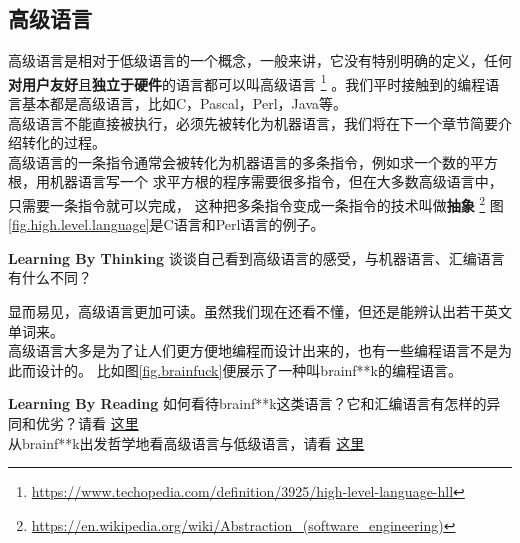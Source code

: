 \subsection{高级语言}
高级语言是相对于低级语言的一个概念，一般来讲，它没有特别明确的定义，任何\textbf{对用户友好}且\textbf{独立于硬件}的语言都可以叫高级语言
\footnote{\url{https://www.techopedia.com/definition/3925/high-level-language-hll}}
。我们平时接触到的编程语言基本都是高级语言，比如C，Pascal，Perl，Java等。\\
高级语言不能直接被执行，必须先被转化为机器语言，我们将在下一个章节简要介绍转化的过程。\\
高级语言的一条指令通常会被转化为机器语言的多条指令，例如求一个数的平方根，用机器语言写一个
求平方根的程序需要很多指令，但在大多数高级语言中，只需要一条指令就可以完成，
这种把多条指令变成一条指令的技术叫做\textbf{抽象}
\footnote{\url{https://en.wikipedia.org/wiki/Abstraction_(software_engineering)}}
图\ref{fig.high.level.language}是C语言和Perl语言的例子。
\begin{paperbox}{\textbf{Learning By Thinking}\starfour}
谈谈自己看到高级语言的感受，与机器语言、汇编语言有什么不同？
\end{paperbox}
显而易见，高级语言更加可读。虽然我们现在还看不懂，但还是能辨认出若干英文单词来。\\
高级语言大多是为了让人们更方便地编程而设计出来的，也有一些编程语言不是为此而设计的。
比如图\ref{fig.brainfuck}便展示了一种叫brainf**k的编程语言。
\begin{paperbox}{\textbf{Learning By Reading}\starone}
如何看待brainf**k这类语言？它和汇编语言有怎样的异同和优劣？请看
\href{https://www.slant.co/versus/120/128/~assembly_vs_brainfuck}{这里}\\
从brainf**k出发哲学地看高级语言与低级语言，请看
\href{https://esolangs.org/wiki/Category_talk:Low-level}{这里}
\end{paperbox}
